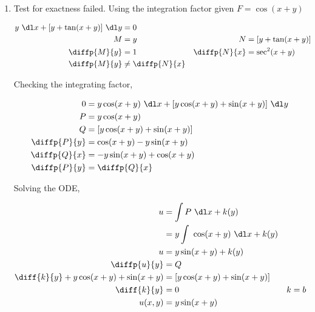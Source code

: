 \begin{enumerate}
    \item Test for exactness failed. Using the integration factor given $ F = \cos(x+y) $

          \begin{align}
              y\ \dl x + [y + \tan(x + y)]\ \dl y & = 0                                                  \\
              M                                   & = y               & N            & = [y + \tan(x+y)] \\
              \diffp{M}{y}                        & = 1               & \diffp{N}{x} & = \sec ^{2}(x+y)  \\
              \diffp{M}{y}                        & \neq \diffp{N}{x}
          \end{align}

          Checking the integrating factor,

          \begin{align}
              0            & = y \cos(x+y)\ \dl x + [y \cos(x+y) + \sin(x+y)]\ \dl y \\
              P            & = y \cos(x+y)                                           \\
              Q            & = [y \cos(x+y) + \sin(x+y)]                             \\
              \diffp{P}{y} & = \cos(x+y) - y \sin(x+y)                               \\
              \diffp{Q}{x} & = -y \sin(x+y) +\cos(x+y)                               \\
              \diffp{P}{y} & = \diffp{Q}{x}
          \end{align}

          Solving the ODE,

          \begin{align}
              u                                    & = \int P\ \dl x + k(y)                      \\
                                                   & = y \int\ \cos(x+y)\ \dl x + k(y)           \\
              u                                    & = y \sin(x+y) + k(y)                        \\
              \diffp{u}{y}                         & = Q                                         \\
              \diff{k}{y} + y\cos(x+y) + \sin(x+y) & = [y \cos(x+y) + \sin(x+y)]                 \\
              \diff{k}{y}                          & = 0                               & k & = b \\
              u(x, y)                              & = y\sin(x+y)
          \end{align}



\end{enumerate}
